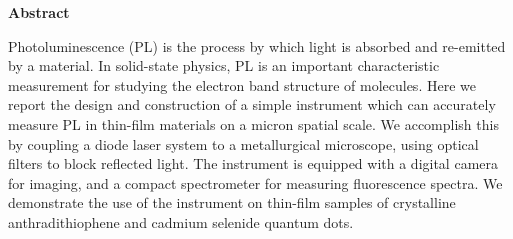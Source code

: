 \thispagestyle{plain}
\begin{center}
 
 
    \textbf{Abstract}
\end{center}

Photoluminescence (PL) is the process by which light is absorbed and re-emitted by a material. In solid-state physics, PL is an important characteristic measurement for studying the electron band structure of molecules. Here we report the design and construction of a simple instrument which can accurately measure PL in thin-film materials on a micron spatial scale. We accomplish this by coupling a diode laser system to a metallurgical microscope, using optical filters to block reflected light. The instrument is equipped with a digital camera for imaging, and a compact spectrometer for measuring fluorescence spectra. We demonstrate the use of the instrument on thin-film samples of crystalline anthradithiophene and cadmium selenide quantum dots.

